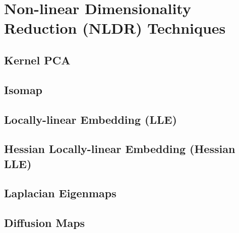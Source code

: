 \documentclass{gtpart}
\theoremstyle{definition}
\begin{document}
\section{Non-linear Dimensionality Reduction (NLDR) Techniques}

\subsection{Kernel PCA}

\subsection{Isomap}

\subsection{Locally-linear Embedding (LLE)}

\subsection{Hessian Locally-linear Embedding (Hessian LLE)}

\subsection{Laplacian Eigenmaps}

\subsection{Diffusion Maps}
\end{document}
